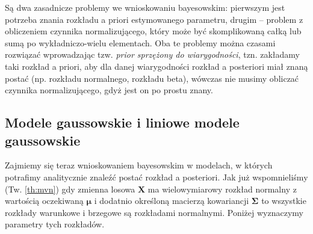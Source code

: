 \documentclass{myclass}
\numberwithin{equation}{subsection}
\begin{document}
Są dwa zasadnicze problemy we wnioskowaniu bayesowskim: pierwszym jest potrzeba znania rozkładu a
priori estymowanego parametru, drugim -- problem z obliczeniem czynnika normalizującego, który może
być skomplikowaną całką lub sumą po wykładniczo-wielu elementach. Oba te problemy można czasami
rozwiązać wprowadzając tzw. \emph{prior sprzężony do wiarygodności}, tzn. zakładamy taki rozkład a
priori, aby dla danej wiarygodności rozkład a posteriori miał znaną postać (np. rozkładu normalnego,
rozkładu beta), wówczas nie musimy obliczać czynnika normalizującego, gdyż jest on po prostu znany.


\subsection{Modele gaussowskie i liniowe modele gaussowskie}

Zajmiemy się teraz wnioskowaniem bayesowskim w modelach, w których potrafimy analitycznie znaleźć
postać rozkład a posteriori. Jak już wspomnieliśmy (Tw. \ref{th:mvn}) gdy zmienna losowa \(\bm{X}\)
ma wielowymiarowy rozkład normalny z wartością oczekiwaną \(\bm{\mu}\) i dodatnio określoną macierzą
kowariancji \(\bm{\Sigma}\) to wszystkie rozkłady warunkowe i brzegowe są rozkładami normalnymi.
Poniżej wyznaczymy parametry tych rozkładów.
\end{document}
